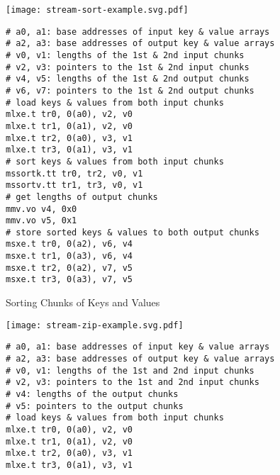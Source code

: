\lstset{style=riscv-asm-style}

\begin{figure*}[tp]
  \centering


  \begin{subfigure}[t]{\cw}
    \centering
    \texttt{[image: stream-sort-example.svg.pdf]}
\begin{lstlisting}[xleftmargin=0.025\tw]
# a0, a1: base addresses of input key & value arrays
# a2, a3: base addresses of output key & value arrays
# v0, v1: lengths of the 1st & 2nd input chunks
# v2, v3: pointers to the 1st & 2nd input chunks
# v4, v5: lengths of the 1st & 2nd output chunks
# v6, v7: pointers to the 1st & 2nd output chunks
# load keys & values from both input chunks
mlxe.t tr0, 0(a0), v2, v0
mlxe.t tr1, 0(a1), v2, v0
mlxe.t tr2, 0(a0), v3, v1
mlxe.t tr3, 0(a1), v3, v1
# sort keys & values from both input chunks
mssortk.tt tr0, tr2, v0, v1
mssortv.tt tr1, tr3, v0, v1
# get lengths of output chunks
mmv.vo v4, 0x0
mmv.vo v5, 0x1
# store sorted keys & values to both output chunks
msxe.t tr0, 0(a2), v6, v4
msxe.t tr1, 0(a3), v6, v4
msxe.t tr2, 0(a2), v7, v5
msxe.t tr3, 0(a3), v7, v5
\end{lstlisting}
    \vspace{-0.4cm}
    \caption{Sorting Chunks of Keys and Values}
    \label{fig-spz-mssort-code}
  \end{subfigure}
  \hfill
  \begin{subfigure}[t]{\cw}
    \centering
    \texttt{[image: stream-zip-example.svg.pdf]}
\begin{lstlisting}[xleftmargin=0.025\tw]
# a0, a1: base addresses of input key & value arrays
# a2, a3: base addresses of output key & value arrays
# v0, v1: lengths of the 1st and 2nd input chunks
# v2, v3: pointers to the 1st and 2nd input chunks
# v4: lengths of the output chunks
# v5: pointers to the output chunks
# load keys & values from both input chunks
mlxe.t tr0, 0(a0), v2, v0
mlxe.t tr1, 0(a1), v2, v0
mlxe.t tr2, 0(a0), v3, v1
mlxe.t tr3, 0(a1), v3, v1

\end{lstlisting}
\end{subfigure}
\end{figure*}
